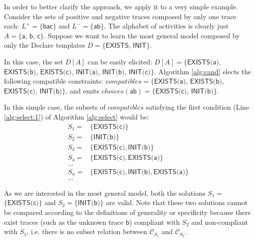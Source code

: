In order to better clarify the approach, we apply it to a very simple example.  
Consider the sets of positive and negative traces composed by only one trace each: $L^+=\{\textsf{bac}\}$ and $L^-=\{\textsf{ab}\}$. The alphabet of activities is clearly just $A=\{\textsf{a, b, c}\}$. Suppose we want to learn the most general model composed by only the Declare templates $D=\{\textsf{EXISTS, INIT}\}$.

In this case, the set $D[A]$ can be easily elicited: $D[A]=\{ \textsf{EXISTS(a)}$, $\textsf{EXISTS(b)}$, $\textsf{EXISTS(c)}$, $\textsf{INIT(a)}$, $\textsf{INIT(b)}$, $\textsf{INIT(c)} \}$. Algorithm \ref{alg:cand} elects the following compatible constraints: ${compatibles}=$$\{ \textsf{EXISTS(a)}$, $\textsf{EXISTS(b)}$, $\textsf{EXISTS(c)}$, $\textsf{INIT(b)}\}$, and emits ${choices}(\textsf{ab})=$$\{ \textsf{EXISTS(c)}$, $\textsf{INIT(b)}\}$.


In this simple case, the subsets of ${compatibles}$ satisfying the first condition (Line \ref{alg:select:1}) of Algorithm \ref{alg:select} would be: 
\[
\begin{array}{cl}
 S_1= &  \{\textsf{EXISTS(c)}\}  \\
 S_2= &  \{\textsf{INIT(b)}\}   \\
 S_3= &  \{\textsf{EXISTS(c)}, \textsf{INIT(b)}\} \\
 S_4= & \{\textsf{EXISTS(c)}, \textsf{EXISTS(a)}\} \\
  ... & \\
 S_n= & \{\textsf{EXISTS(c)}, \textsf{INIT(b)}, \textsf{EXISTS(a)}\} \\
 ... &
\end{array}
\]

As we are interested in the most general model, both the solutions $S_1=$ $\{\textsf{EXISTS(c)}\}$ and $S_2=$$\{\textsf{INIT(b)}\}$ are valid. Note that these two solutions cannot be compared according to the definitions of generality or specificity because there exist traces (such as the unknown trace $\textsf{b}$) compliant with $S_2$ and non-compliant with $S_1$, i.e. there is no subset relation between $\mathcal{C}_{S_1}$ and $\mathcal{C}_{S_2}$.

